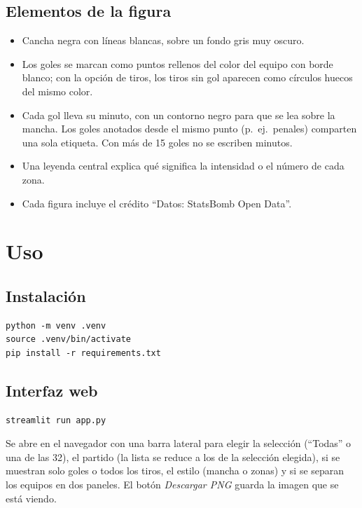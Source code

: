 \documentclass[11pt,a4paper]{article}
\begin{document}
\subsection{Elementos de la figura}

\begin{itemize}
  \item Cancha negra con líneas blancas, sobre un fondo gris muy oscuro.
  \item Los goles se marcan como puntos rellenos del color del equipo con borde blanco; con
    la opción de tiros, los tiros sin gol aparecen como círculos huecos del mismo color.
  \item Cada gol lleva su minuto, con un contorno negro para que se lea sobre la mancha.
    Los goles anotados desde el mismo punto (p.\ ej.\ penales) comparten una sola etiqueta.
    Con más de 15 goles no se escriben minutos.
  \item Una leyenda central explica qué significa la intensidad o el número de cada zona.
  \item Cada figura incluye el crédito ``Datos: StatsBomb Open Data''.
\end{itemize}

\section{Uso}

\subsection{Instalación}

\begin{lstlisting}
python -m venv .venv
source .venv/bin/activate
pip install -r requirements.txt
\end{lstlisting}

\subsection{Interfaz web}

\begin{lstlisting}
streamlit run app.py
\end{lstlisting}

Se abre en el navegador con una barra lateral para elegir la selección (``Todas'' o una de
las 32), el partido (la lista se reduce a los de la selección elegida), si se muestran solo
goles o todos los tiros, el estilo (mancha o zonas) y si se separan los equipos en dos
paneles. El botón \emph{Descargar PNG} guarda la imagen que se está viendo.
\end{document}
